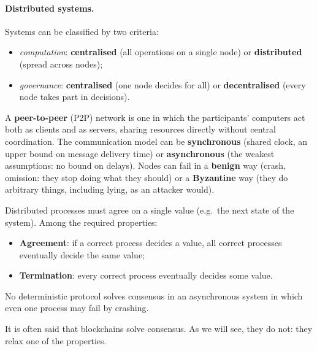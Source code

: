 \paragraph{Distributed systems.} Systems can be classified by two criteria:
\begin{itemize}
    \item \emph{computation}: \textbf{centralised} (all operations on a single node) or \textbf{distributed} (spread across nodes);
    \item \emph{governance}: \textbf{centralised} (one node decides for all) or \textbf{decentralised} (every node takes part in decisions).
\end{itemize}
A \textbf{peer-to-peer} (P2P) network is one in which the participants' computers act both as clients and as servers, sharing resources directly without central coordination. The communication model can be \textbf{synchronous} (shared clock, an upper bound on message delivery time) or \textbf{asynchronous} (the weakest assumptions: no bound on delays). Nodes can fail in a \textbf{benign} way (crash, omission: they stop doing what they should) or a \textbf{Byzantine} way (they do arbitrary things, including lying, as an attacker would).

\begin{definition}[Consensus]
Distributed processes must agree on a single value (e.g.\ the next state of the system). Among the required properties:
\begin{itemize}
    \item \textbf{Agreement}: if a correct process decides a value, all correct processes eventually decide the same value;
    \item \textbf{Termination}: every correct process eventually decides some value.
\end{itemize}
\end{definition}

\begin{theorem}
No deterministic protocol solves consensus in an asynchronous system in which even one process may fail by crashing.
\end{theorem}
It is often said that blockchains solve consensus. As we will see, they do not: they relax one of the properties.

